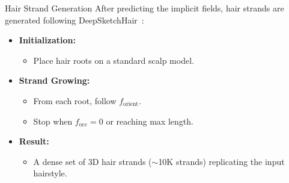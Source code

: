 \begin{frame}[t]{Hair Strand Generation}
    After predicting the implicit fields, hair strands are generated following DeepSketchHair~\cite{shen2020deepsketchhair}:
    \begin{itemize}
        \item \textbf{Initialization:}
        \begin{itemize}
            \item Place hair roots on a standard scalp model.
        \end{itemize}
        \item \textbf{Strand Growing:}
        \begin{itemize}
            \item From each root, follow $f_{\text{orient}}$.
            \item Stop when $f_{\text{occ}} = 0$ or reaching max length.
        \end{itemize}
        \item \textbf{Result:}
        \begin{itemize}
            \item A dense set of 3D hair strands ($\sim$10K strands) replicating the input hairstyle.
        \end{itemize}
    \end{itemize}
\end{frame}

